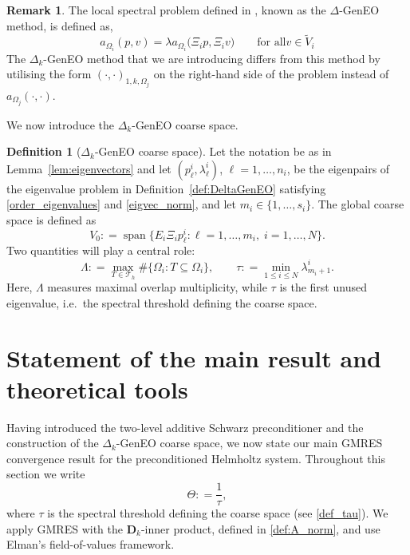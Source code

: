 \documentclass[preprint,3p,times]{elsarticle}
\newcommand{\Th}{\mathcal{T}_h}
\newcommand{\assign}{\mathrel{\mathop:}=}
\theoremstyle{definition}
\newtheorem{remark}[theorem]{Remark}
\newtheorem{definition}[theorem]{Definition}
\numberwithin{equation}{section}
\begin{document}
\begin{remark}
The local spectral problem defined in \cite{Bootland:2022:OSM}, known as the $\Delta$-GenEO method, is defined as,
\[
	a_{\Omega_i}(p,v) = \lambda a_{\Omega_i}\bigl(\Xi_i p,\Xi_i v\bigr)
	\qquad\text{for all} v\in\widetilde{V}_i
\]
The $\Delta_k$-GenEO method that we are introducing differs from this method by utilising the form $(\cdot,\cdot)_{1,k,\Omega_j}$ 
on the right-hand side of the problem instead of $a_{\Omega_j}(\cdot,\cdot)$.
\end{remark}

We now introduce the $\Delta_k$-GenEO coarse space.

\begin{definition}[$\Delta_k$-GenEO coarse space]\label{def:DeltaCoarse}
Let the notation be as in Lemma~\ref{lem:eigenvectors} and 
let $(p_\ell^i,\lambda_\ell^i)$, $\ell=1,\ldots,n_i$, be the eigenpairs of the
eigenvalue problem in Definition~\ref{def:DeltaGenEO} satisfying \eqref{order_eigenvalues} and \eqref{eigvec_norm},
and let $m_i\in\{1,\ldots,s_i\}$.
The global coarse space is defined as
\[
	V_0 \assign \operatorname{span}\bigl\{E_i \Xi_i p_\ell^i: \ell=1,\dots,m_i,\; i=1,\dots,N\bigr\}.
\]
Two quantities will play a central role:
\begin{equation}\label{def_tau}
	\Lambda \assign \max_{T\in \Th} \#\{ \Omega_i : T\subseteq \Omega_i \}, 
	\qquad
	\tau \assign \min_{1\le i \le N} \lambda^i_{m_i+1}.
\end{equation}
Here, $\Lambda$ measures maximal overlap multiplicity, while $\tau$ is the first unused eigenvalue, 
i.e.\ the spectral threshold defining the coarse space.
\end{definition}



\section{Statement of the main result and theoretical tools}
\label{sec:main-result}

Having introduced the two-level additive Schwarz preconditioner and the construction of the $\Delta_k$-GenEO coarse space, we now state our main GMRES convergence result for the preconditioned Helmholtz system. Throughout this section we write
\begin{equation}\label{def_Theta_delta_k}
	\Theta \assign \frac{1}{\tau},
\end{equation}
where $\tau$ is the spectral threshold defining the coarse space (see \eqref{def_tau}). 
We apply GMRES with the $\mathbf{D}_k$-inner product, defined in \eqref{def:A_norm}, and use Elman's field-of-values framework.
\end{document}
